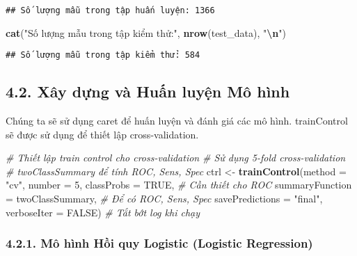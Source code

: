 \documentclass[
]{article}
\newenvironment{Shaded}{\begin{snugshade}}{\end{snugshade}}
\newcommand{\AttributeTok}[1]{\textcolor[rgb]{0.13,0.29,0.53}{#1}}
\newcommand{\CommentTok}[1]{\textcolor[rgb]{0.56,0.35,0.01}{\textit{#1}}}
\newcommand{\ConstantTok}[1]{\textcolor[rgb]{0.56,0.35,0.01}{#1}}
\newcommand{\DecValTok}[1]{\textcolor[rgb]{0.00,0.00,0.81}{#1}}
\newcommand{\FunctionTok}[1]{\textcolor[rgb]{0.13,0.29,0.53}{\textbf{#1}}}
\newcommand{\NormalTok}[1]{#1}
\newcommand{\OtherTok}[1]{\textcolor[rgb]{0.56,0.35,0.01}{#1}}
\newcommand{\SpecialCharTok}[1]{\textcolor[rgb]{0.81,0.36,0.00}{\textbf{#1}}}
\newcommand{\StringTok}[1]{\textcolor[rgb]{0.31,0.60,0.02}{#1}}
\begin{document}
\begin{verbatim}
## Số lượng mẫu trong tập huấn luyện: 1366
\end{verbatim}

\begin{Shaded}
\begin{Highlighting}[]
\FunctionTok{cat}\NormalTok{(}\StringTok{"Số lượng mẫu trong tập kiểm thử:"}\NormalTok{, }\FunctionTok{nrow}\NormalTok{(test\_data), }\StringTok{"}\SpecialCharTok{\textbackslash{}n}\StringTok{"}\NormalTok{)}
\end{Highlighting}
\end{Shaded}

\begin{verbatim}
## Số lượng mẫu trong tập kiểm thử: 584
\end{verbatim}

\subsection{4.2. Xây dựng và Huấn luyện Mô
hình}\label{xuxe2y-dux1ef1ng-vuxe0-huux1ea5n-luyux1ec7n-muxf4-huxecnh}

Chúng ta sẽ sử dụng caret để huấn luyện và đánh giá các mô hình.
trainControl sẽ được sử dụng để thiết lập cross-validation.

\begin{Shaded}
\begin{Highlighting}[]
\CommentTok{\# Thiết lập train control cho cross{-}validation}
\CommentTok{\# Sử dụng 5{-}fold cross{-}validation}
\CommentTok{\# \textquotesingle{}twoClassSummary\textquotesingle{} để tính ROC, Sens, Spec}
\NormalTok{ctrl }\OtherTok{\textless{}{-}} \FunctionTok{trainControl}\NormalTok{(}\AttributeTok{method =} \StringTok{"cv"}\NormalTok{, }
                     \AttributeTok{number =} \DecValTok{5}\NormalTok{, }
                     \AttributeTok{classProbs =} \ConstantTok{TRUE}\NormalTok{, }\CommentTok{\# Cần thiết cho ROC}
                     \AttributeTok{summaryFunction =}\NormalTok{ twoClassSummary, }\CommentTok{\# Để có ROC, Sens, Spec}
                     \AttributeTok{savePredictions =} \StringTok{"final"}\NormalTok{,}
                     \AttributeTok{verboseIter =} \ConstantTok{FALSE}\NormalTok{) }\CommentTok{\# Tắt bớt log khi chạy}
\end{Highlighting}
\end{Shaded}

\subsubsection{4.2.1. Mô hình Hồi quy Logistic (Logistic
Regression)}\label{muxf4-huxecnh-hux1ed3i-quy-logistic-logistic-regression}
\end{document}
